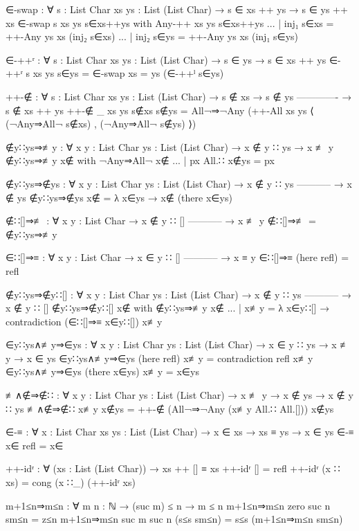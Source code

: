 \begin{code}
  ∈-swap : ∀ {s : List Char} {xs ys : List (List Char)}
    → s ∈ xs ++ ys
    → s ∈ ys ++ xs
  ∈-swap {s} {xs} {ys} s∈xs++ys with Any-++ xs ys s∈xs++ys
  ... | inj₁ s∈xs = ++-Any ys xs (inj₂ s∈xs)
  ... | inj₂ s∈ys = ++-Any ys xs (inj₁ s∈ys)

  ∈-++ʳ : ∀ {s : List Char} {xs ys : List (List Char)}
    → s ∈ ys
    → s ∈ xs ++ ys
  ∈-++ʳ {s} {xs} {ys} s∈ys = ∈-swap {xs = ys} (∈-++ˡ s∈ys)

  ++-∉ : ∀ {s : List Char} {xs ys : List (List Char)}
    → s ∉ xs
    → s ∉ ys
      -------------
    → s ∉ xs ++ ys
  ++-∉ {_} {xs} {ys} s∉xs s∉ys = All¬⇒¬Any
    (++-All xs ys ⟨ (¬Any⇒All¬ s∉xs) , (¬Any⇒All¬ s∉ys) ⟩)

  ∉y∷ys⇒≢y : ∀ {x y : List Char} {ys : List (List Char)}
    → x ∉ y ∷ ys
    → x ≢ y
  ∉y∷ys⇒≢y x∉ with ¬Any⇒All¬ x∉
  ... | px All.∷ x∉ys = px

  ∉y∷ys⇒∉ys : ∀ {x y : List Char} {ys : List (List Char)}
    → x ∉ y ∷ ys
      -----------
    → x ∉ ys
  ∉y∷ys⇒∉ys x∉ = λ x∈ys → x∉ (there x∈ys)

  ∉∷[]⇒≢ : ∀ {x y : List Char}
    → x ∉ y ∷ []
      -----------
    → x ≢ y
  ∉∷[]⇒≢ = ∉y∷ys⇒≢y

  ∈∷[]⇒≡ : ∀ {x y : List Char}
    → x ∈ y ∷ []
      -----------
    → x ≡ y
  ∈∷[]⇒≡ (here refl) = refl

  ∉y∷ys⇒∉y∷[] : ∀ {x y : List Char} {ys : List (List Char)}
    → x ∉ y ∷ ys
      -----------
    → x ∉ y ∷ []
  ∉y∷ys⇒∉y∷[] x∉ with ∉y∷ys⇒≢y x∉
  ... | x≢y = λ x∈y∷[] → contradiction (∈∷[]⇒≡ x∈y∷[]) x≢y

  ∈y∷ys∧≢y⇒∈ys : ∀ {x y : List Char} {ys : List (List Char)}
    → x ∈ y ∷ ys
    → x ≢ y
    → x ∈ ys
  ∈y∷ys∧≢y⇒∈ys (here refl) x≢y = contradiction refl x≢y
  ∈y∷ys∧≢y⇒∈ys (there x∈ys) x≢y = x∈ys

  ≢∧∉⇒∉∷ : ∀ {x y : List Char} {ys : List (List Char)}
    → x ≢ y
    → x ∉ ys
    → x ∉ y ∷ ys
  ≢∧∉⇒∉∷ x≢y x∉ys = ++-∉ (All¬⇒¬Any (x≢y All.∷ All.[])) x∉ys
  
  ∈-≡ : ∀ {x : List Char} {xs ys : List (List Char)}
    → x ∈ xs → xs ≡ ys → x ∈ ys
  ∈-≡ x∈ refl = x∈

  ++-idʳ : ∀ (xs : List (List Char)) → xs ++ [] ≡ xs
  ++-idʳ [] = refl
  ++-idʳ (x ∷ xs) = cong (x ∷_) (++-idʳ xs)

  m+1≤n⇒m≤n : ∀ {m n : ℕ} → (suc m) ≤ n → m ≤ n
  m+1≤n⇒m≤n {zero} {suc n} sm≤n = z≤n
  m+1≤n⇒m≤n {suc m} {suc n} (s≤s sm≤n) = s≤s (m+1≤n⇒m≤n sm≤n)
\end{code}
